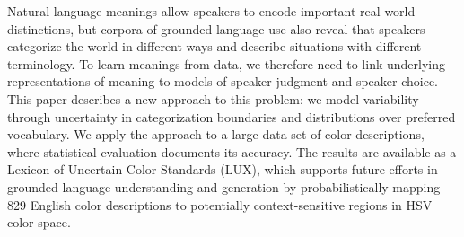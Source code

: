 Natural language meanings allow speakers to encode important real-world distinctions, but corpora of grounded language use also reveal that speakers categorize the world in different ways and describe situations with different terminology. To learn meanings from data, we therefore need to link underlying representations of meaning to models of speaker judgment and speaker choice.  This paper describes a new approach to this problem: we model variability through uncertainty in categorization boundaries and distributions over preferred vocabulary. We apply the approach to a large data set of color descriptions, where statistical evaluation documents its accuracy. The results are available as a Lexicon of Uncertain Color Standards (LUX), which supports future efforts in grounded language understanding and generation by probabilistically mapping 829 English color descriptions to potentially context-sensitive regions in HSV color space.